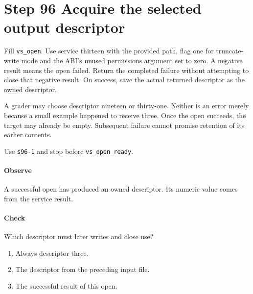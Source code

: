\section{Step 96 Acquire the selected output descriptor}
Fill \texttt{vs\_open}. Use service thirteen with the provided path, flag one for truncate-write mode and the ABI's unused permissions argument set to zero. A negative result means the open failed. Return the completed failure without attempting to close that negative result. On success, save the actual returned descriptor as the owned descriptor.

A grader may choose descriptor nineteen or thirty-one. Neither is an error merely because a small example happened to receive three. Once the open succeeds, the target may already be empty. Subsequent failure cannot promise retention of its earlier contents.

Use \texttt{s96-1} and stop before \texttt{vs\_open\_ready}.

\paragraph{Observe} A successful open has produced an owned descriptor. Its numeric value comes from the service result.

\paragraph{Check} Which descriptor must later writes and close use?
\begin{enumerate}[label=\Alph*.]
  \item Always descriptor three.
  \item The descriptor from the preceding input file.
  \item The successful result of this open.
\end{enumerate}

